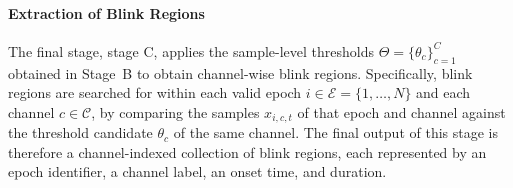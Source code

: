 \paragraph{Extraction of Blink Regions}
The final stage, stage C, applies the sample-level thresholds
\(\Theta=\{\theta_c\}_{c=1}^{C}\) obtained in Stage~B to obtain channel-wise
blink regions. Specifically, blink regions are searched for within each valid
epoch \(i \in \mathcal{E}=\{1,\ldots,N\}\) and each channel
\(c \in \mathcal{C}\), by comparing the samples \(x_{i,c,t}\) of that epoch and
channel against the threshold candidate \(\theta_c\) of the same channel.
The final output of this stage is therefore a channel-indexed collection of blink regions, each represented by an epoch identifier, a channel label, an onset time, and duration.


